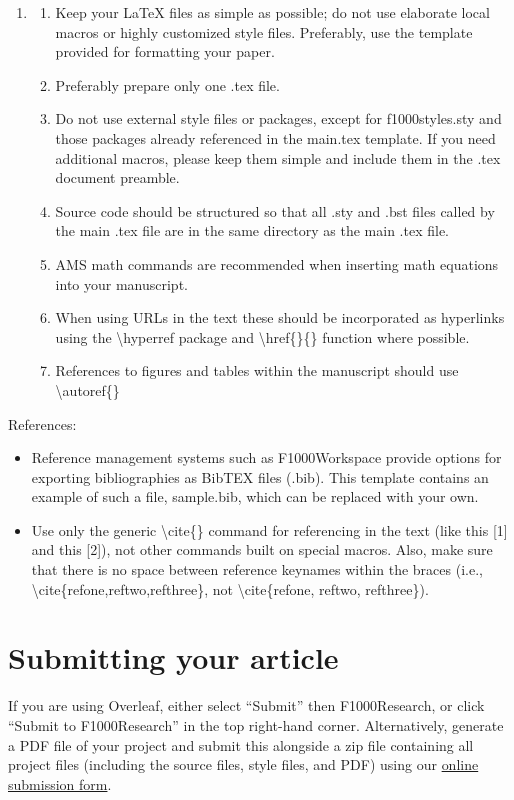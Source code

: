 \documentclass[10pt,a4paper]{article}
\begin{document}
\begin{enumerate}
    \item[~]
	\begin{enumerate}
		\item Keep your LaTeX files as simple as possible; do not use elaborate local macros or highly customized style files. Preferably, use the template provided for formatting your paper.
		\item Preferably prepare only one .tex file. 
		\item Do not use external style files or packages, except for f1000styles.sty and those packages already referenced in the main.tex template. If you need additional macros, please keep them simple and include them in the .tex document preamble.
		\item Source code should be structured so that all .sty and .bst files called by the main .tex file are in the same directory as the main .tex file.
		\item AMS math commands are recommended when inserting math equations into your manuscript.
		\item When using URLs in the text these should be incorporated as hyperlinks using the \textbackslash hyperref package and \textbackslash href\{\}\{\} function where possible.
		\item References to figures and tables within the manuscript should use \textbackslash autoref\{\}
	\end{enumerate}
\end{enumerate}

References:
\begin{itemize}
	\item Reference management systems such as F1000Workspace provide options for exporting bibliographies as BibTEX files (.bib). This template contains an example of such a file, sample.bib, which can be replaced with your own.
	\item Use only the generic \textbackslash cite\{\} command for referencing in the text (like this [1] and this [2]), not other commands built on special macros. Also, make sure that there is no space between reference keynames within the braces (i.e., \textbackslash cite\{refone,reftwo,refthree\}, not \textbackslash cite\{refone, reftwo, refthree\}).
\end{itemize}

\section*{Submitting your article}
If you are using Overleaf,  either select “Submit” then F1000Research, or click “Submit to F1000Research” in the top right-hand corner. Alternatively, generate a PDF file of your project and submit this alongside a zip file containing all project files (including the source files, style files, and PDF) using our \href{https://f1000research.com/for-authors/publish-your-research}{online submission form}. 
\end{document}
